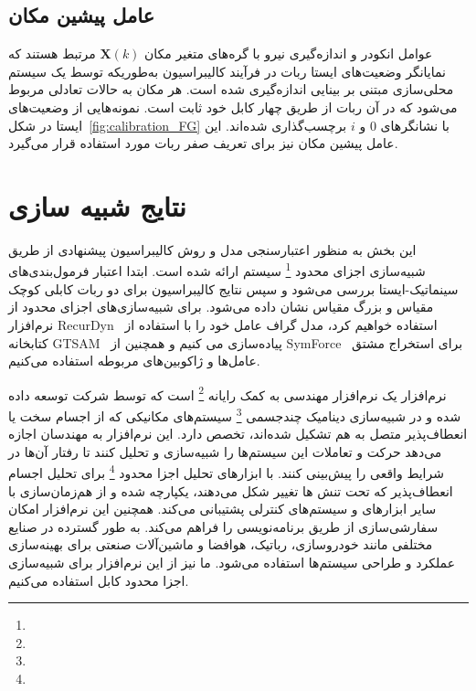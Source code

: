 \subsection{عامل پیشین مکان}
عوامل انکودر و اندازه‌گیری نیرو با گره‌های متغیر مکان $\bm{X}(k)$ مرتبط هستند که نمایانگر وضعیت‌های ایستا ربات در فرآیند کالیبراسیون به‌طوریکه توسط یک سیستم محلی‌سازی مبتنی بر بینایی اندازه‌گیری شده است. 
هر مکان به حالات تعادلی مربوط می‌شود که در آن ربات از طریق چهار کابل خود ثابت است. نمونه‌هایی از وضعیت‌های ایستا در شکل~\ref{fig:calibration_FG} با نشانگرهای $0$ و $i$ برچسب‌گذاری شده‌اند. این عامل پیشین  مکان نیز برای تعریف صفر ربات مورد استفاده قرار می‌گیرد.



\section{نتایج شبیه سازی} \label{sec:results}
این بخش به منظور اعتبارسنجی مدل و روش کالیبراسیون پیشنهادی از طریق شبیه‌سازی اجزای محدود
\footnote{}
 سیستم ارائه شده است. ابتدا اعتبار فرمول‌بندی‌های سینماتیک-ایستا بررسی می‌شود و سپس نتایج کالیبراسیون برای دو ربات کابلی کوچک مقیاس و بزرگ مقیاس نشان داده می‌شود. برای شبیه‌سازی‌های اجزای محدود از نرم‌افزار RecurDyn~\cite{functionbay} استفاده خواهیم کرد، مدل گراف عامل خود را با استفاده از کتابخانه GTSAM~\cite{dellaert2012factor} پیاده‌سازی می کنیم و همچنین از SymForce~\cite{Martiros-RSS-22} برای استخراج مشتق عامل‌ها و ژاکوبین‌های مربوطه استفاده می‌کنیم.


نرم‌افزار  یک نرم‌افزار مهندسی به کمک رایانه
\footnote{}
است که توسط شرکت  توسعه داده شده و در شبیه‌سازی دینامیک چندجسمی 
\footnote{}
 سیستم‌های مکانیکی که از اجسام سخت یا انعطاف‌پذیر متصل به هم تشکیل شده‌اند، تخصص دارد. این نرم‌افزار به مهندسان اجازه می‌دهد حرکت و تعاملات این سیستم‌ها را شبیه‌سازی و تحلیل کنند تا رفتار آن‌ها در شرایط واقعی را پیش‌بینی کنند.  با ابزارهای تحلیل اجزا محدود 
\footnote{}
  برای تحلیل اجسام انعطاف‌پذیر که تحت تنش ها تغییر شکل می‌دهند، یکپارچه شده و از هم‌زمان‌سازی با سایر ابزارهای  و سیستم‌های کنترلی پشتیبانی می‌کند. همچنین این نرم‌افزار امکان سفارشی‌سازی از طریق برنامه‌نویسی را فراهم می‌کند.  به طور گسترده در صنایع مختلفی مانند خودروسازی، رباتیک، هوافضا و ماشین‌آلات صنعتی برای بهینه‌سازی عملکرد و طراحی سیستم‌ها استفاده می‌شود. ما نیز از این نرم‌افزار برای شبیه‌سازی اجزا محدود کابل استفاده می‌کنیم.

